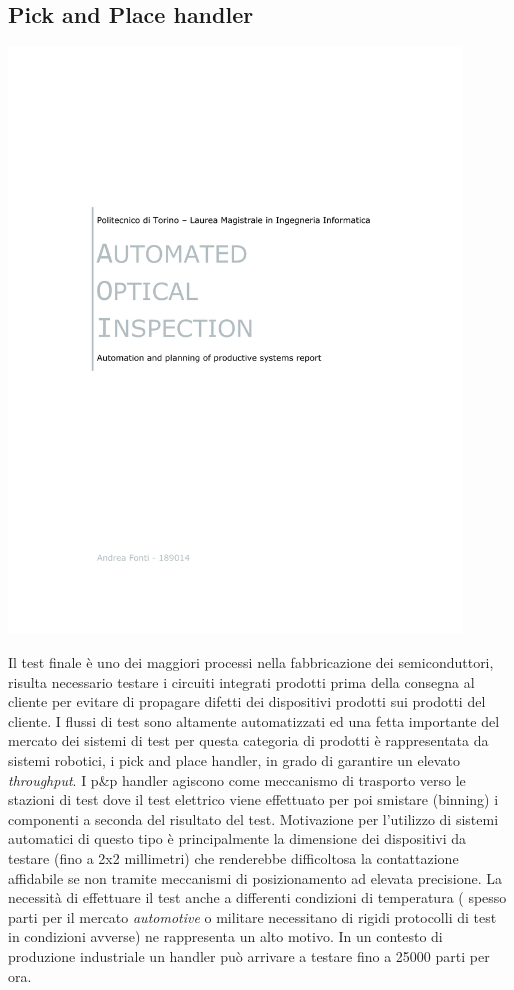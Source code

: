 \subsection{Pick and Place handler}
\includegraphics[clip=true, trim= 50 260 50 320,page=21,width=0.9\textwidth]{materiale/tesina-carlucci.pdf}

Il test finale è uno dei maggiori processi nella fabbricazione dei semiconduttori, risulta necessario testare  i circuiti integrati prodotti prima della consegna al cliente per evitare di propagare difetti dei dispositivi prodotti sui prodotti del cliente. 
I flussi di test sono altamente automatizzati ed una fetta importante del mercato dei sistemi di test per 
questa categoria di prodotti è rappresentata da sistemi robotici, i pick and place handler, in grado di 
garantire un elevato \emph{throughput}. 
I p\&p handler agiscono come meccanismo di trasporto verso le stazioni di test dove il test elettrico viene 
effettuato per poi smistare (binning) i componenti a seconda del risultato del test. Motivazione per 
l'utilizzo di sistemi automatici di questo tipo è principalmente la dimensione dei dispositivi da testare (fino a 2x2 millimetri) che renderebbe difficoltosa la contattazione affidabile se non tramite meccanismi di 
posizionamento ad elevata precisione. La necessità di effettuare il test anche a differenti condizioni di temperatura ( spesso parti per il mercato \emph{automotive} o militare necessitano di rigidi protocolli di test in 
condizioni avverse) ne rappresenta un alto motivo. In un contesto di produzione industriale un handler può arrivare a testare fino a 
25000 parti per ora. 

